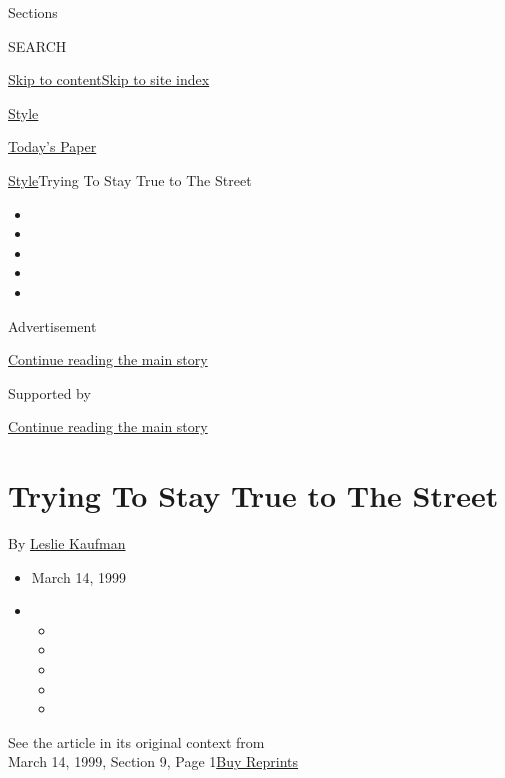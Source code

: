 Sections

SEARCH

\protect\hyperlink{site-content}{Skip to
content}\protect\hyperlink{site-index}{Skip to site index}

\href{https://www.nytimes3xbfgragh.onion/section/style}{Style}

\href{https://myaccount.nytimes3xbfgragh.onion/auth/login?response_type=cookie\&client_id=vi}{}

\href{https://www.nytimes3xbfgragh.onion/section/todayspaper}{Today's
Paper}

\href{/section/style}{Style}\textbar{}Trying To Stay True to The Street

\begin{itemize}
\item
\item
\item
\item
\item
\end{itemize}

Advertisement

\protect\hyperlink{after-top}{Continue reading the main story}

Supported by

\protect\hyperlink{after-sponsor}{Continue reading the main story}

\hypertarget{trying-to-stay-true-to-the-street}{%
\section{Trying To Stay True to The
Street}\label{trying-to-stay-true-to-the-street}}

By \href{https://www.nytimes3xbfgragh.onion/by/leslie-kaufman}{Leslie
Kaufman}

\begin{itemize}
\item
  March 14, 1999
\item
  \begin{itemize}
  \item
  \item
  \item
  \item
  \item
  \end{itemize}
\end{itemize}

See the article in its original context from\\
March 14, 1999, Section 9, Page
1\href{https://store.nytimes3xbfgragh.onion/collections/new-york-times-page-reprints?utm_source=nytimes\&utm_medium=article-page\&utm_campaign=reprints}{Buy
Reprints}

